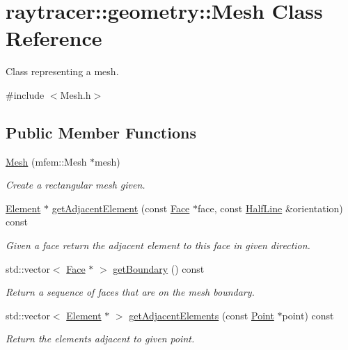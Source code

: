 \hypertarget{classraytracer_1_1geometry_1_1Mesh}{}\section{raytracer\+:\+:geometry\+:\+:Mesh Class Reference}
\label{classraytracer_1_1geometry_1_1Mesh}


Class representing a mesh.  




{\ttfamily \#include $<$Mesh.\+h$>$}

\subsection*{Public Member Functions}
\begin{DoxyCompactItemize}
\item 
\mbox{\label{classraytracer_1_1geometry_1_1Mesh_a653770f6c079e9be27480039deb758eb}} 
\hyperlink{classraytracer_1_1geometry_1_1Mesh_a653770f6c079e9be27480039deb758eb}{Mesh} (mfem\+::\+Mesh $\ast$mesh)
\begin{DoxyCompactList}\small\item\em Create a rectangular mesh given. \end{DoxyCompactList}\item 
\hyperlink{classraytracer_1_1geometry_1_1Element}{Element} $\ast$ \hyperlink{classraytracer_1_1geometry_1_1Mesh_abc14a8ac714460926e8f2bcacdf49cbd}{get\+Adjacent\+Element} (const \hyperlink{classraytracer_1_1geometry_1_1Face}{Face} $\ast$face, const \hyperlink{structraytracer_1_1geometry_1_1HalfLine}{Half\+Line} \&orientation) const
\begin{DoxyCompactList}\small\item\em Given a face return the adjacent element to this face in given direction. \end{DoxyCompactList}\item 
std\+::vector$<$ \hyperlink{classraytracer_1_1geometry_1_1Face}{Face} $\ast$ $>$ \hyperlink{classraytracer_1_1geometry_1_1Mesh_a3f7cc92317844c16e350469f7a2222af}{get\+Boundary} () const
\begin{DoxyCompactList}\small\item\em Return a sequence of faces that are on the mesh boundary. \end{DoxyCompactList}\item 
std\+::vector$<$ \hyperlink{classraytracer_1_1geometry_1_1Element}{Element} $\ast$ $>$ \hyperlink{classraytracer_1_1geometry_1_1Mesh_a0fcef1d3e48815807ea6b498d3c45b1b}{get\+Adjacent\+Elements} (const \hyperlink{classraytracer_1_1geometry_1_1Point}{Point} $\ast$point) const
\begin{DoxyCompactList}\small\item\em Return the elements adjacent to given point. \end{DoxyCompactList}\end{DoxyCompactItemize}


